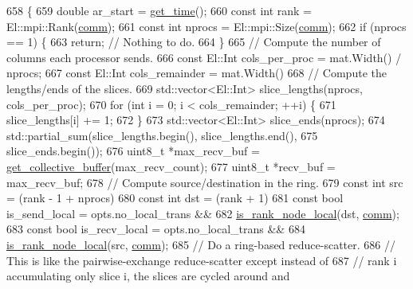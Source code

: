 \begin{DoxyCode}
658                                           \{
659   \textcolor{keywordtype}{double} ar\_start = \hyperlink{namespacelbann_a478d36031ff0659893c4322cd856157f}{get\_time}();
660   \textcolor{keyword}{const} \textcolor{keywordtype}{int} rank = El::mpi::Rank(\hyperlink{file__io_8cpp_ab048c6f9fcbcfaa57ce68b00263dbebe}{comm});
661   \textcolor{keyword}{const} \textcolor{keywordtype}{int} nprocs = El::mpi::Size(\hyperlink{file__io_8cpp_ab048c6f9fcbcfaa57ce68b00263dbebe}{comm});
662   \textcolor{keywordflow}{if} (nprocs == 1) \{
663     \textcolor{keywordflow}{return};  \textcolor{comment}{// Nothing to do.}
664   \}
665   \textcolor{comment}{// Compute the number of columns each processor sends.}
666   \textcolor{keyword}{const} El::Int cols\_per\_proc = mat.Width() / nprocs;
667   \textcolor{keyword}{const} El::Int cols\_remainder = mat.Width() %
668   \textcolor{comment}{// Compute the lengths/ends of the slices.}
669   std::vector<El::Int> slice\_lengths(nprocs, cols\_per\_proc);
670   \textcolor{keywordflow}{for} (\textcolor{keywordtype}{int} i = 0; i < cols\_remainder; ++i) \{
671     slice\_lengths[i] += 1;
672   \}
673   std::vector<El::Int> slice\_ends(nprocs);
674   std::partial\_sum(slice\_lengths.begin(), slice\_lengths.end(),
675                    slice\_ends.begin());
676   uint8\_t *max\_recv\_buf = \hyperlink{classlbann_1_1lbann__comm_ae925ac5eaf2895717c709b252961b3bf}{get\_collective\_buffer}(max\_recv\_count);
677   uint8\_t *recv\_buf = max\_recv\_buf;
678   \textcolor{comment}{// Compute source/destination in the ring.}
679   \textcolor{keyword}{const} \textcolor{keywordtype}{int} src = (rank - 1 + nprocs) %
680   \textcolor{keyword}{const} \textcolor{keywordtype}{int} dst = (rank + 1) %
681   \textcolor{keyword}{const} \textcolor{keywordtype}{bool} is\_send\_local = opts.no\_local\_trans &&
682                              \hyperlink{classlbann_1_1lbann__comm_a5cdd318d1505ba0f31bf4fe9fadffacc}{is\_rank\_node\_local}(dst, \hyperlink{file__io_8cpp_ab048c6f9fcbcfaa57ce68b00263dbebe}{comm});
683   \textcolor{keyword}{const} \textcolor{keywordtype}{bool} is\_recv\_local = opts.no\_local\_trans &&
684                              \hyperlink{classlbann_1_1lbann__comm_a5cdd318d1505ba0f31bf4fe9fadffacc}{is\_rank\_node\_local}(src, \hyperlink{file__io_8cpp_ab048c6f9fcbcfaa57ce68b00263dbebe}{comm});
685   \textcolor{comment}{// Do a ring-based reduce-scatter.}
686   \textcolor{comment}{// This is like the pairwise-exchange reduce-scatter except instead of}
687   \textcolor{comment}{// rank i accumulating only slice i, the slices are cycled around and}

\end{DoxyCode}
